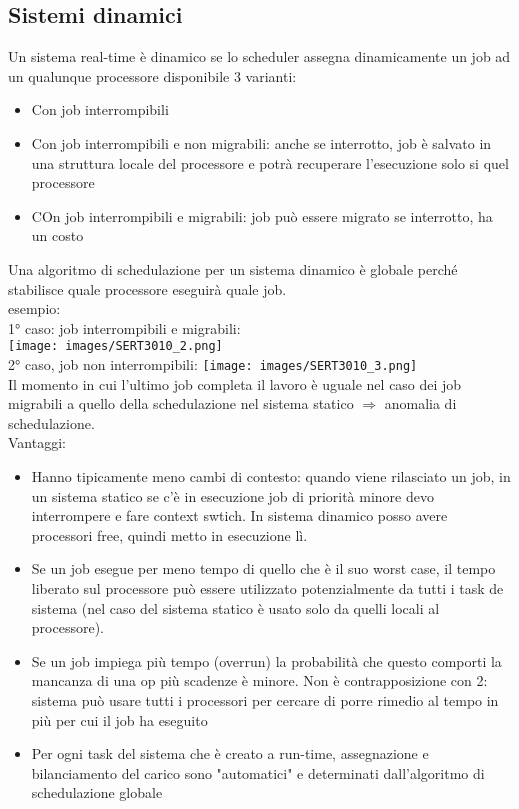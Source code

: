 \documentclass[18px]{article}
\begin{document}
\subsection{Sistemi dinamici}
Un sistema real-time è dinamico se lo scheduler assegna dinamicamente un job ad un qualunque processore disponibile
3 varianti:
\begin{itemize}
\item Con job interrompibili
\item Con job interrompibili e non migrabili: anche se interrotto, job è salvato in una struttura locale del processore e potrà recuperare l'esecuzione solo si quel processore
\item COn job interrompibili e migrabili: job può essere migrato se interrotto, ha un costo
\end{itemize}
Una algoritmo di schedulazione per un sistema dinamico è globale perché stabilisce quale processore eseguirà quale job. \\esempio:\\
1° caso: job interrompibili e migrabili:\\
\texttt{[image: images/SERT3010\_2.png]}\\
2° caso, job non interrompibili:
\texttt{[image: images/SERT3010\_3.png]}\\ Il momento in cui l'ultimo job completa il lavoro è uguale nel caso dei job migrabili a quello della schedulazione nel sistema statico $\Rightarrow$ anomalia di schedulazione.\\ Vantaggi:
\begin{itemize}
\item Hanno tipicamente meno cambi di contesto: quando viene rilasciato un job, in un sistema statico se c'è in esecuzione job di priorità minore devo interrompere e fare context swtich. In sistema dinamico posso avere processori free, quindi metto in esecuzione lì.
\item Se un job esegue per meno tempo di quello che è il suo worst case, il tempo liberato sul processore può essere utilizzato potenzialmente da tutti i task de sistema (nel caso del sistema statico è usato solo da quelli locali al processore).
\item Se un job impiega più tempo (overrun) la probabilità che questo comporti la mancanza di una op più scadenze è minore. Non è contrapposizione con 2: sistema può usare tutti i processori per cercare di porre rimedio al tempo in più per cui il job ha eseguito
\item Per ogni task del sistema che è creato a run-time, assegnazione e bilanciamento del carico sono "automatici" e determinati dall'algoritmo di schedulazione globale
\end{itemize}
\end{document}
